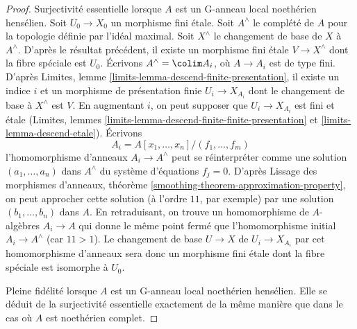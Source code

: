 \begin{proof}
\medskip\noindent
Surjectivité essentielle lorsque $A$ est un G-anneau local noethérien hensélien.
Soit $U_0 \to X_0$ un morphisme fini étale.
Soit $A^\wedge$ le complété de $A$ pour la topologie définie par l'idéal maximal.
Soit $X^\wedge$ le changement de base de $X$ à $A^\wedge$.
D'après le résultat précédent, il existe un morphisme fini étale
$V \to X^\wedge$ dont la fibre spéciale est $U_0$.
Écrivons $A^\wedge = \colim A_i$, où $A \to A_i$ est de type fini.
D'après Limites, lemme \ref{limits-lemma-descend-finite-presentation},
il existe un indice $i$ et un morphisme de présentation finie $U_i \to X_{A_i}$
dont le changement de base à $X^\wedge$ est $V$. En augmentant $i$,
on peut supposer que $U_i \to X_{A_i}$ est fini et étale
(Limites, lemmes \ref{limits-lemma-descend-finite-finite-presentation} et
\ref{limits-lemma-descend-etale}). Écrivons
$$
A_i = A[x_1, \ldots, x_n]/(f_1, \ldots, f_m)
$$
l'homomorphisme d'anneaux $A_i \to A^\wedge$ peut se réinterpréter comme une solution
$(a_1, \ldots, a_n)$ dans $A^\wedge$ du système d'équations $f_j = 0$.
D'après Lissage des morphismes d'anneaux, théorème \ref{smoothing-theorem-approximation-property},
on peut approcher cette solution (à l'ordre $11$, par exemple) par une solution
$(b_1, \ldots, b_n)$ dans $A$. En retraduisant, on trouve un homomorphisme de $A$-algèbres
$A_i \to A$ qui donne le même point fermé que l'homomorphisme initial
$A_i \to A^\wedge$ (car $11 > 1$). Le changement de base $U \to X$ de $U_i \to X_{A_i}$
par cet homomorphisme d'anneaux sera donc un morphisme fini étale dont la
fibre spéciale est isomorphe à $U_0$.

\medskip\noindent
Pleine fidélité lorsque $A$ est un G-anneau local noethérien hensélien.
Elle se déduit de la surjectivité essentielle exactement de la même
manière que dans le cas où $A$ est noethérien complet.


\end{proof}
